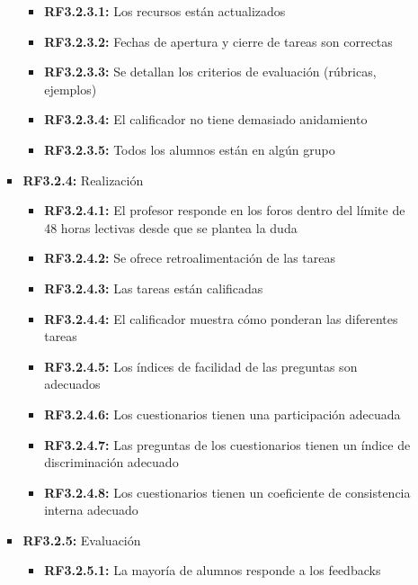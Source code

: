 \begin{itemize}
\begin{itemize}
\begin{itemize}
                        \begin{itemize}
                            \item \textbf{RF3.2.3.1:} Los recursos están actualizados
                            \item \textbf{RF3.2.3.2:} Fechas de apertura y cierre de tareas son correctas
                            \item \textbf{RF3.2.3.3:} Se detallan los criterios de evaluación (rúbricas, ejemplos)
                            \item \textbf{RF3.2.3.4:} El calificador no tiene demasiado anidamiento
                            \item \textbf{RF3.2.3.5:} Todos los alumnos están en algún grupo
                        \end{itemize}
                    \item \textbf{RF3.2.4:} Realización
                        \begin{itemize}
                            \item \textbf{RF3.2.4.1:} El profesor responde en los foros dentro del límite de 48 horas lectivas desde que se plantea la duda
                            \item \textbf{RF3.2.4.2:} Se ofrece retroalimentación de las tareas
                            \item \textbf{RF3.2.4.3:} Las tareas están calificadas
                            \item \textbf{RF3.2.4.4:} El calificador muestra cómo ponderan las diferentes tareas
                            \item \textbf{RF3.2.4.5:} Los índices de facilidad de las preguntas son adecuados
                            \item \textbf{RF3.2.4.6:} Los cuestionarios tienen una participación adecuada
                            \item \textbf{RF3.2.4.7:} Las preguntas de los cuestionarios tienen un índice de discriminación adecuado
                            \item \textbf{RF3.2.4.8:} Los cuestionarios tienen un coeficiente de consistencia interna adecuado
                        \end{itemize}
                    \item \textbf{RF3.2.5:} Evaluación
                        \begin{itemize}
                            \item \textbf{RF3.2.5.1:} La mayoría de alumnos responde a los feedbacks

\end{itemize}
\end{itemize}
\end{itemize}
\end{itemize}

